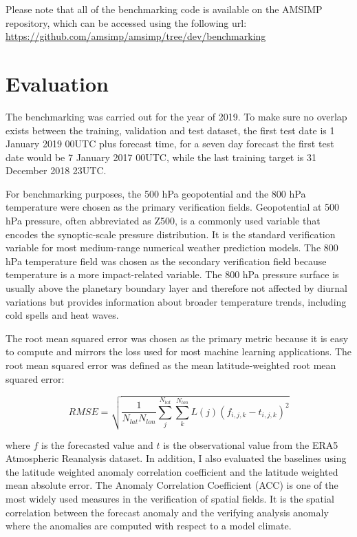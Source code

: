Please note that all of the benchmarking code is available on the AMSIMP repository, which can be accessed using the following url: \url{https://github.com/amsimp/amsimp/tree/dev/benchmarking}

\section{Evaluation}
The benchmarking was carried out for the year of 2019. To make sure no overlap exists between the training, validation and test dataset, the first test date is 1 January 2019 00UTC plus forecast time, for a seven day forecast the first test date would be 7 January 2017 00UTC, while the last training target is 31 December 2018 23UTC. 

For benchmarking purposes, the 500 hPa geopotential and the 800 hPa temperature were chosen as the primary verification fields. Geopotential at 500 hPa pressure, often abbreviated as Z500, is a commonly used variable that encodes the synoptic-scale pressure distribution. It is the standard verification variable for most medium-range numerical weather prediction models. The 800 hPa temperature field was chosen as the secondary verification field because temperature is a more impact-related variable. The 800 hPa pressure surface is usually above the planetary boundary layer and therefore not affected by diurnal variations but provides information about broader temperature trends, including cold spells and heat waves. 

The root mean squared error was chosen as the primary metric because it is easy to compute and mirrors the loss used for most machine learning applications. The root mean squared error was defined as the mean latitude-weighted root mean squared error:

\begin{equation}
    RMSE = \sqrt{\frac{1}{N_{lat} N_{lon}} \sum_{j}^{N_{lat}} \sum_{k}^{N_{lon}} L(j) (f_{i, j, k} - t_{i, j, k})^2}
\end{equation}

where $f$ is the forecasted value and $t$ is the observational value from the ERA5 Atmospheric Reanalysis dataset. In addition, I also evaluated the baselines using the latitude weighted anomaly correlation coefficient and the latitude weighted mean absolute error. The Anomaly Correlation Coefficient (ACC) is one of the most widely used measures in the verification of spatial fields. It is the spatial correlation between the forecast anomaly and the verifying analysis anomaly where the anomalies are computed with respect to a model climate. 
